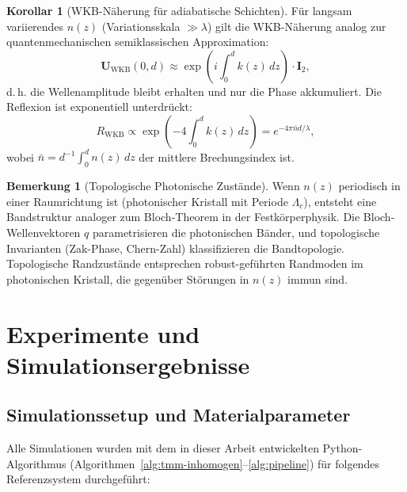 ﻿\documentclass[a4paper,12pt]{article}
\theoremstyle{definition}
\newtheorem{korollar}{Korollar}[section]
\newtheorem{bemerkung}{Bemerkung}[section]
\newcommand{\matr}[1]{\mathbf{#1}}
\begin{document}
	\begin{korollar}[WKB-Näherung für adiabatische Schichten]
		\label{kor:wkb}
		Für langsam variierendes $n(z)$ (Variationsskala $\gg \lambda$) gilt
		die WKB-Näherung analog zur quantenmechanischen semiklassischen Approximation:
		\begin{equation}
			\matr{U}_\mathrm{WKB}(0, d) \approx
			\exp\!\left(i\int_0^d k(z)\, dz\right) \cdot \matr{I}_2,
			\label{eq:wkb}
		\end{equation}
		d.\,h. die Wellenamplitude bleibt erhalten und nur die Phase akkumuliert.
		Die Reflexion ist exponentiell unterdrückt:
		\begin{equation}
			R_\mathrm{WKB} \propto \exp\!\left(-4\int_0^d k(z)\, dz\right)
			= e^{-4\pi\bar{n}d/\lambda},
			\label{eq:wkb-reflexion}
		\end{equation}
		wobei $\bar{n} = d^{-1}\int_0^d n(z)\, dz$ der mittlere Brechungsindex ist.
	\end{korollar}
	
	\begin{bemerkung}[Topologische Photonische Zustände]
		Wenn $n(z)$ periodisch in einer Raumrichtung ist (photonischer Kristall
		mit Periode $\Lambda_c$), entsteht eine Bandstruktur analoger zum
		Bloch-Theorem in der Festkörperphysik. Die Bloch-Wellenvektoren $q$
		parametrisieren die photonischen Bänder, und topologische Invarianten
		(Zak-Phase, Chern-Zahl) klassifizieren die Bandtopologie.
		Topologische Randzustände entsprechen robust-geführten Randmoden im
		photonischen Kristall, die gegenüber Störungen in $n(z)$ immun sind.
	\end{bemerkung}
	
	\section{Experimente und Simulationsergebnisse}
	\label{sec:experimente}
	
	\subsection{Simulationssetup und Materialparameter}
	
	Alle Simulationen wurden mit dem in dieser Arbeit entwickelten
	Python-Algorithmus (Algorithmen~\ref{alg:tmm-inhomogen}--\ref{alg:pipeline})
	für folgendes Referenzsystem durchgeführt:
	
\end{document}
